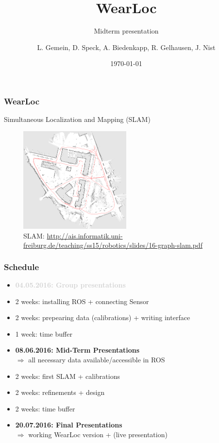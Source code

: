 \documentclass{beamer}
\title{WearLoc}
\subtitle{Midterm presentation}
\author{L. Gemein, D. Speck, A. Biedenkapp, R. Gelhausen, J. Nist}
\date{\today}
\begin{document}
\maketitle

\begin{frame} %
\frametitle{WearLoc}%
\begin{center}Simultaneous Localization and Mapping (SLAM)
\end{center}
\begin{figure}
\includegraphics[width=0.5\textwidth]{slam.png} 
\caption{SLAM: \url{http://ais.informatik.uni-freiburg.de/teaching/ss15/robotics/slides/16-graph-slam.pdf}}
\end{figure}
\end{frame}


\begin{frame}
\frametitle{Schedule}
\begin{itemize}
\item \textcolor{lightgray}{\textbf{04.05.2016: Group presentations}}
\item 2 weeks: installing ROS + connecting Sensor
\item 2 weeks: prepearing data (calibrations) + writing interface
\item 1 week: time buffer 
\item \textbf{08.06.2016: Mid-Term Presentations} \\
$\Rightarrow$ all necessary data available/accessible in ROS
\color{lightgray}
\item 2 weeks: first SLAM + calibrations
\item 2 weeks: refinements + design
\item 2 weeks: time buffer
\item \textbf{20.07.2016: Final Presentations} \\
$\Rightarrow$ working WearLoc version + (live presentation) 
\end{itemize}
\end{frame}
\end{document}
